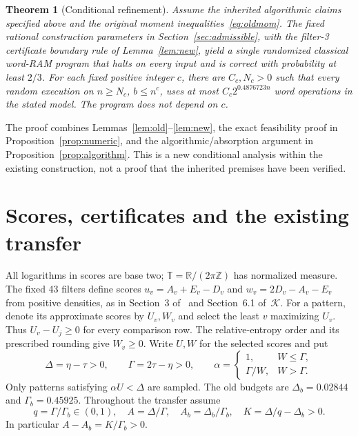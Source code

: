 \documentclass[11pt]{article}
\newtheorem{theorem}{Theorem}
\theoremstyle{remark}\newtheorem*{remark}{Scope}
\newcommand{\T}{\mathbb T}
\begin{document}
\begin{theorem}[Conditional refinement]\label{thm:main}
Assume the inherited algorithmic claims specified above and the original
moment inequalities~\eqref{eq:oldmom}. The fixed rational construction
parameters in Section~\ref{sec:admissible}, with the filter-3 certificate
boundary rule of Lemma~\ref{lem:new}, yield a single randomized classical
word-RAM program that halts on every input and is correct with probability
at least $2/3$. For each fixed positive integer $c$, there are $C_c,N_c>0$
such that every random execution on $n\ge N_c$, $b\le n^c$, uses at most
$C_c2^{0.4876723n}$ word operations in the stated model. The program does
not depend on $c$.
\end{theorem}
The proof combines Lemmas~\ref{lem:old}--\ref{lem:new}, the exact
feasibility proof in Proposition~\ref{prop:numeric}, and the
algorithmic/absorption argument in Proposition~\ref{prop:algorithm}.
This is a new conditional analysis within the existing construction,
not a proof that the inherited premises have been verified.

\section{Scores, certificates and the existing transfer}
All logarithms in scores are base two; $\T=\mathbb R/(2\pi\mathbb Z)$
has normalized measure. The fixed 43 filters define scores
$u_v=A_v+E_v-D_v$ and $w_v=2D_v-A_v-E_v$ from positive densities,
as in Section~3 of~\cite{openai} and Section~6.1 of~$\mathcal K$.
For a pattern, denote its approximate scores by $U_v,W_v$ and select the
least $v$ maximizing $U_v$. Thus $U_v-U_j\ge0$ for every comparison row.
The relative-entropy order and its prescribed rounding give $W_v\ge0$.
Write $U,W$ for the selected scores and put
\begin{equation}\label{eq:budgets}
 \Delta=\eta-\tau>0,\qquad\Gamma=2\tau-\eta>0,\qquad
 \alpha=\begin{cases}1,&W\le\Gamma,\\ \Gamma/W,&W>\Gamma.\end{cases}
\end{equation}
Only patterns satisfying $\alpha U<\Delta$ are sampled.
The old budgets are $\Delta_b=0.02844$ and $\Gamma_b=0.45925$.
Throughout the transfer assume
\begin{equation}\label{eq:qK}
 q=\Gamma/\Gamma_b\in(0,1),\quad
 A=\Delta/\Gamma,\quad A_b=\Delta_b/\Gamma_b,\quad
 K=\Delta/q-\Delta_b>0.
\end{equation}
In particular $A-A_b=K/\Gamma_b>0$.
\end{document}
